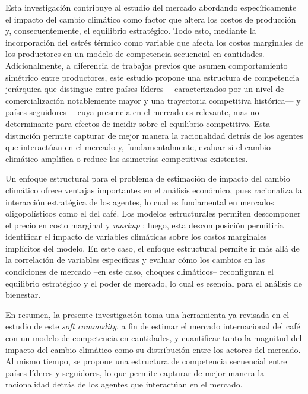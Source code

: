 Esta investigación contribuye al estudio del mercado abordando específicamente el impacto del cambio climático como factor que altera los costos de producción y, consecuentemente, el equilibrio estratégico. Todo esto, mediante la incorporación del estrés térmico como variable que afecta los costos marginales de los productores en un modelo de competencia secuencial en cantidades. Adicionalmente, a diferencia de trabajos previos que asumen comportamiento simétrico entre productores, este estudio propone una estructura de competencia jerárquica que distingue entre países líderes —caracterizados por un nivel de comercialización notablemente mayor y una trayectoria competitiva histórica— y países seguidores —cuya presencia en el mercado es relevante, mas no determinante para efectos de incidir sobre el equilibrio competitivo. Esta distinción permite capturar de mejor manera la racionalidad detrás de los agentes que interactúan en el mercado y, fundamentalmente, evaluar si el cambio climático amplifica o reduce las asimetrías competitivas existentes.

Un enfoque estructural para el problema de estimación de impacto del cambio climático ofrece ventajas importantes en el análisis económico, pues racionaliza la interacción estratégica de los agentes, lo cual es fundamental en mercados oligopolísticos como el del café. Los modelos estructurales permiten descomponer el precio en costo marginal y \textit{markup} \citep{bresnahan1989empirical, slade1995empirical, bettendorf2000incomplete}; luego, esta descomposición permitiría identificar el impacto de variables climáticas sobre los costos marginales implícitos del modelo. En este caso, el enfoque estructural permite ir más allá de la correlación de variables específicas y evaluar cómo los cambios en las condiciones de mercado --en este caso, choques climáticos-- reconfiguran el equilibrio estratégico y el poder de mercado, lo cual es esencial para el análisis de bienestar.

En resumen, la presente investigación toma una herramienta ya revisada en el estudio de este \textit{soft commodity}, a fin de estimar el mercado internacional del café con un modelo de competencia en cantidades, y cuantificar tanto la magnitud del impacto del cambio climático como su distribución entre los actores del mercado. Al mismo tiempo, se propone una estructura de competencia secuencial entre países líderes y seguidores, lo que permite capturar de mejor manera la racionalidad detrás de los agentes que interactúan en el mercado. 

